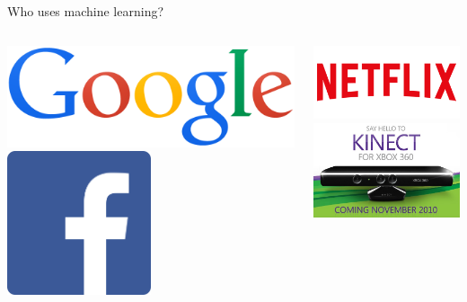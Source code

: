 \documentclass[pdf]{beamer}
\begin{document}
\begin{frame}{Who uses machine learning?}
\begin{columns}
\begin{center}
	\includegraphics[width=\textwidth]{google.png}
	\vspace{2cm}
	\includegraphics[width=0.5\textwidth]{facebook.png}
\end{center}
\begin{center}
	\includegraphics[width=\textwidth]{netflix.png}\\
	\includegraphics[width=\textwidth]{kinect.jpg}\\

\end{center}
\end{columns}
\end{frame}
\end{document}
